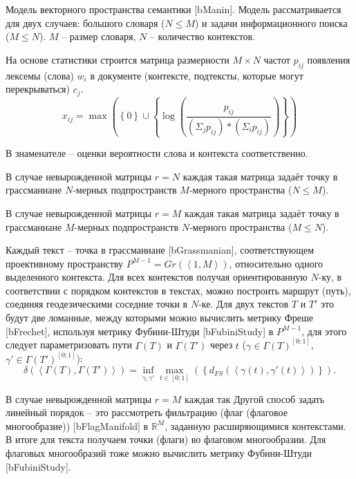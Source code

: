 Модель векторного пространства семантики [bManin]. Модель рассматривается для двух случаев: большого словаря ($N\leq{M}$) и задачи информационного поиска ($M\leq{N}$). $M$ -- размер словаря, $N$ -- количество контекстов.

На основе статистики строится матрица размерности $M\times{N}$ частот $p_{ij}$ появления лексемы (слова) $w_{i}$ в документе (контексте, подтексты, которые могут перекрываться) $c_{j}$.
$$
x_{ij}=\max{\left( \left\lbrace 0\right\rbrace \cup \left\lbrace \log{\left(\frac{p_{ij}}{\left( \Sigma_{j} p_{ij}\right) *\left( \Sigma_{i} p_{ij}\right) } \right) }\right\rbrace \right) }
$$

В знаменателе -- оценки вероятности слова и контекста соответственно.

В случае невырожденной матрицы $r=N$ каждая такая матрица задаёт точку в грассманиане $N$‑мерных подпространств $M$‑мерного пространства ($N\leq{M}$).

В случае невырожденной матрицы $r=M$ каждая такая матрица задаёт точку в грассманиане $M$‑мерных подпространств $N$‑мерного пространства ($M\leq{N}$).

Каждый текст -- точка в грассманиане [bGrassmanian], соответствующем проективному пространству $P^{M-1}=Gr\left( \left\langle1,M \right\rangle \right)$, относительно одного выделенного контекста. Для всех контекстов получая ориентированную $N$-ку, в соответствии с порядком контекстов в текстах, можно построить маршрут (путь), соединяя геодезическими соседние точки в $N$-ке. Для двух текстов $T$ и $T'$ это будут две ломанные, между которыми можно вычислить метрику Фреше [bFrechet], используя метрику Фубини-Штуди [bFubiniStudy] в $P^{M-1}$, для этого следует параметризовать пути $\Gamma\left( T \right)$ и $\Gamma\left( T' \right)$ через $t$ ($\gamma\in\Gamma\left( T \right)^{\left[ 0;1\right] }$,$\gamma' \in\Gamma\left( T'\right)^{\left[ 0;1\right] }$): 
$$
\delta\left( \left\langle \Gamma\left( T \right),\Gamma\left( T'\right)\right\rangle \right) =\inf_{\gamma,\gamma'}\max_{t\in\left[ 0;1\right] }\left(  \left\lbrace d_{FS}\left( \left\langle \gamma\left( t\right) ,\gamma'\left( t\right) \right\rangle \right) \right\rbrace \right).
$$

В случае невырожденной матрицы $r=M$ каждая так
Другой способ задать линейный порядок -- это рассмотреть фильтрацию (флаг (флаговое многообразие)) [bFlagManifold] в $\mathbb{R}^{M}$, заданную расширяющимися контекстами. В итоге для текста получаем точки (флаги) во флаговом многообразии. Для флаговых многообразий тоже можно вычислить метрику Фубини-Штуди [bFubiniStudy].

